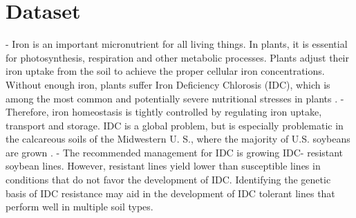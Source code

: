 \documentclass[11pt,a4paper,oldfontcommands,openany]{memoir}
\numberwithin{equation}{section} %
\begin{document}
\section{Dataset}

- Iron is an important micronutrient for all living things. In plants, it is essential for photosynthesis, respiration and other metabolic processes. Plants adjust their iron uptake from the soil to achieve the proper cellular iron concentrations. Without enough iron, plants suffer Iron Deficiency Chlorosis (IDC), which is among the most common and potentially severe nutritional stresses in plants \citealt{soy1}.
- Therefore, iron homeostasis is tightly controlled by regulating iron uptake, transport and storage. IDC is a global problem, but is especially problematic in the calcareous soils of the Midwestern U. S., where the majority of U.S. soybeans are grown \citealt{soy3}.
- The recommended management for IDC is growing IDC- resistant soybean lines. However, resistant lines yield lower than susceptible lines in conditions that do not favor the development of IDC. Identifying the genetic basis of IDC resistance may aid in the development of IDC tolerant lines that perform well in multiple soil types.
\end{document}
